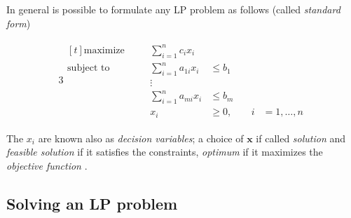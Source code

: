%
In general is possible to formulate any \acrshort{LP} problem as follows (called \emph{standard form}) \cite{Vanderbei2008}

\begin{alignat}{3}
	\label{eq:standard-form}
	\begin{aligned}[t]
		\text{maximize}   &       & \sum_{i=1}^{n} c_{i}x_{i}                                          \\
		\text{subject to} & \quad & \sum_{i=1}^{n} a_{1i}  x_{i} & \leq b_{1} &                        \\
		                  &       & \vdots                                                             \\
		                  &       & \sum_{i=1}^{n} a_{mi}  x_{i} & \leq b_{m} &                        \\
		                  &       & x_{i}                        & \geq 0,    & \quad i & =1 ,\dots, n
	\end{aligned}
\end{alignat}


The $x_i$ are known also as \emph{decision variables}; a choice of $ \mathbf{x}
$ if called \emph{solution} and \emph{feasible solution} if it satisfies the
constraints, \emph{optimum} if it maximizes the \emph{objective function}
\cite{Vanderbei2008}.

\subsection{Solving an LP problem}%
\label{sub:solving_an_lp_problem}

